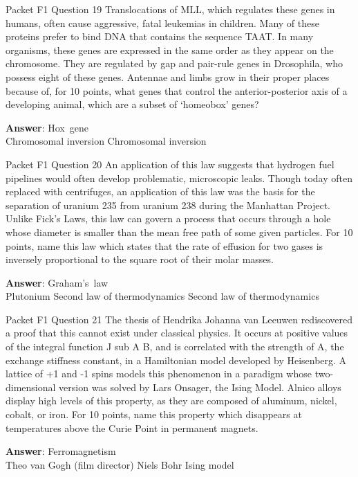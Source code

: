 \begin{frame}{Packet F1 Question 19}
Translocations of MLL,     which regulates these genes in humans,       often cause aggressive, fatal leukemias in children. Many of these proteins prefer to bind DNA that contains the sequence TAAT. In many organisms,   these genes are expressed in the same order as they appear on the chromosome. They are regulated by gap and pair-rule genes in Drosophila, who possess eight of these genes. Antennae and limbs grow in their proper places because of, for 10 points, what genes that control the anterior-posterior axis of a developing animal, which are a subset of `homeobox' genes?

\textbf{Answer}: Hox\ gene\\
 Chromosomal inversion
 Chromosomal inversion
\end{frame}

\begin{frame}{Packet F1 Question 20}
An application of this law suggests that hydrogen fuel pipelines would often develop problematic, microscopic leaks. Though today often replaced with centrifuges, an application of this law was the basis for the separation of uranium 235 from uranium 238 during the Manhattan Project. Unlike Fick’s Laws,     this law can govern a process that occurs through a hole   whose diameter is smaller than the mean free path of some given particles. For 10 points, name this law which states that the rate of effusion for two gases is   inversely proportional to the square root   of their molar masses.  

\textbf{Answer}: Graham's\ law\\
 Plutonium
 Second law of thermodynamics
 Second law of thermodynamics
\end{frame}

\begin{frame}{Packet F1 Question 21}
The thesis of Hendrika Johanna van Leeuwen   rediscovered a proof   that this cannot exist under classical physics. It occurs at positive values of the integral function J sub A B, and is correlated with the strength of A, the exchange stiffness constant, in a Hamiltonian model developed by Heisenberg. A lattice of +1 and -1 spins models this phenomenon in a paradigm whose two-dimensional version was solved by Lars Onsager,     the Ising Model. Alnico alloys display high levels of this property, as they are composed of aluminum, nickel, cobalt,     or iron. For 10 points, name this property which disappears   at temperatures above the Curie Point in permanent magnets.

\textbf{Answer}: Ferromagnetism\\
 Theo van Gogh (film director)
 Niels Bohr
 Ising model
\end{frame}

